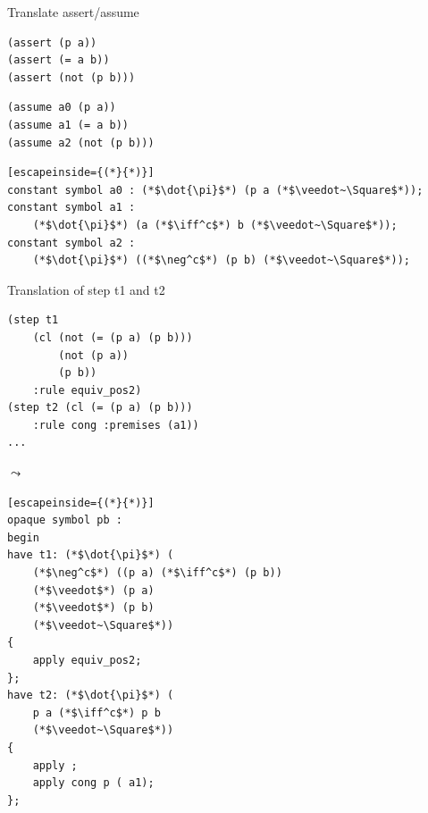 \documentclass[aspectratio=169,xcolor={dvipsnames}]{beamer}
\begin{document}
\begin{frame}[fragile]{Translate assert/assume}
\noindent\begin{minipage}{.40\textwidth}
\begin{verbatim}
(assert (p a))
(assert (= a b))
(assert (not (p b)))
\end{verbatim}
\end{minipage}
\newline
\noindent\begin{minipage}{.40\textwidth}
\begin{verbatim}
(assume a0 (p a))
(assume a1 (= a b))
(assume a2 (not (p b)))
\end{verbatim}
\end{minipage}
\hfill\begin{minipage}{.55\textwidth}
\begin{lstlisting}[escapeinside={(*}{*)}]
constant symbol a0 : (*$\dot{\pi}$*) (p a (*$\veedot~\Square$*));
constant symbol a1 :
    (*$\dot{\pi}$*) (a (*$\iff^c$*) b (*$\veedot~\Square$*));
constant symbol a2 :
    (*$\dot{\pi}$*) ((*$\neg^c$*) (p b) (*$\veedot~\Square$*));
\end{lstlisting}
\end{minipage}
\end{frame}

\begin{frame}[fragile]{Translation of step t1 and t2}
\noindent\begin{minipage}{.45\textwidth}
\begin{verbatim}
(step t1
    (cl (not (= (p a) (p b)))
        (not (p a))
        (p b))
    :rule equiv_pos2)
(step t2 (cl (= (p a) (p b)))
    :rule cong :premises (a1))
...
\end{verbatim}
\end{minipage}
$\leadsto$\hfill \begin{minipage}{.45\textwidth}
\begin{lstlisting}[escapeinside={(*}{*)}]
opaque symbol pb : 
begin
have t1: (*$\dot{\pi}$*) (
    (*$\neg^c$*) ((p a) (*$\iff^c$*) (p b))
    (*$\veedot$*) (p a)
    (*$\veedot$*) (p b)
    (*$\veedot~\Square$*))
{
    apply equiv_pos2;
};
have t2: (*$\dot{\pi}$*) (
    p a (*$\iff^c$*) p b
    (*$\veedot~\Square$*))
{
    apply ;
    apply cong p ( a1);
};
\end{lstlisting}
\end{minipage}
\end{frame}
\end{document}
